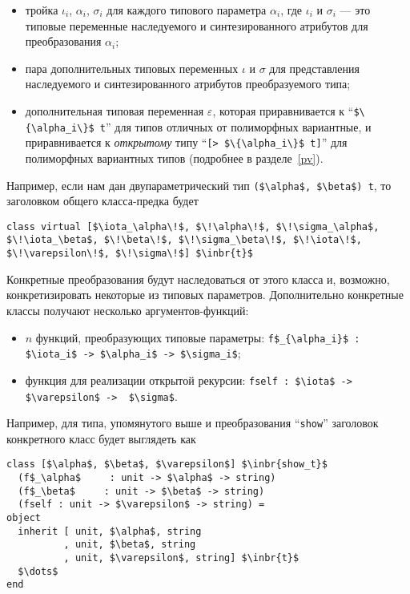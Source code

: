 \begin{itemize}
\item тройка $\iota_i$, $\alpha_i$, $\sigma_i$ для каждого типового параметра $\alpha_i$, где $\iota_i$ и $\sigma_i$ --- это типовые переменные наследуемого и синтезированного атрибутов для преобразования  $\alpha_i$;
\item пара дополнительных типовых переменных $\iota$ и $\sigma$ для представления наследуемого и синтезированного атрибутов преобразуемого типа;
\item дополнительная типовая переменная $\varepsilon$, которая приравнивается к ``\lstinline|$\{\alpha_i\}$ t|'' для типов отличных от полиморфных вариантные, и приравнивается к \emph{открытому} типу ``\lstinline|[> $\{\alpha_i\}$ t]|'' для полиморфных вариантных типов (подробнее в разделе~\ref{pv}).
\end{itemize}

\noindent Например, если нам дан двупараметрический тип \lstinline{($\alpha$, $\beta$) t}, то заголовком общего класса-предка будет 

\begin{lstlisting}
class virtual [$\iota_\alpha\!$, $\!\alpha\!$, $\!\sigma_\alpha$, $\!\iota_\beta$, $\!\beta\!$, $\!\sigma_\beta\!$, $\!\iota\!$, $\!\varepsilon\!$, $\!\sigma\!$] $\inbr{t}$
\end{lstlisting}

Конкретные преобразования будут наследоваться от этого класса и, возможно, конкретизировать некоторые из типовых параметров.
Дополнительно конкретные классы получают несколько аргументов-функций:

\begin{itemize}
\item $n$ функций, преобразующих типовые параметры: \lstinline|f$_{\alpha_i}$ : $\iota_i$ -> $\alpha_i$ -> $\sigma_i$|;
\item функция для реализации открытой рекурсии: \lstinline|fself : $\iota$ -> $\varepsilon$ ->  $\sigma$|.
\end{itemize}

\noindent Например, для типа, упомянутого выше и преобразования ``\lstinline{show}'' заголовок конкретного класс будет выглядеть как

\begin{lstlisting}
class [$\alpha$, $\beta$, $\varepsilon$] $\inbr{show_t}$ 
  (f$_\alpha$     : unit -> $\alpha$ -> string)
  (f$_\beta$     : unit -> $\beta$ -> string)
  (fself : unit -> $\varepsilon$ -> string) =
object 
  inherit [ unit, $\alpha$, string
          , unit, $\beta$, string
          , unit, $\varepsilon$, string] $\inbr{t}$
  $\dots$
end 
\end{lstlisting}

